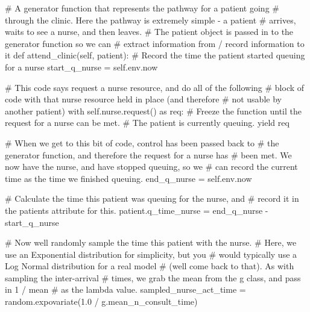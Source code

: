 \documentclass[
  letterpaper,
  DIV=11,
  numbers=noendperiod]{scrreprt}
\newenvironment{Shaded}{\begin{snugshade}}{\end{snugshade}}
\newcommand{\CommentTok}[1]{\textcolor[rgb]{0.37,0.37,0.37}{#1}}
\newcommand{\ControlFlowTok}[1]{\textcolor[rgb]{0.00,0.23,0.31}{#1}}
\newcommand{\FloatTok}[1]{\textcolor[rgb]{0.68,0.00,0.00}{#1}}
\newcommand{\ImportTok}[1]{\textcolor[rgb]{0.00,0.46,0.62}{#1}}
\newcommand{\KeywordTok}[1]{\textcolor[rgb]{0.00,0.23,0.31}{#1}}
\newcommand{\NormalTok}[1]{\textcolor[rgb]{0.00,0.23,0.31}{#1}}
\newcommand{\OperatorTok}[1]{\textcolor[rgb]{0.37,0.37,0.37}{#1}}
\newcommand{\VariableTok}[1]{\textcolor[rgb]{0.07,0.07,0.07}{#1}}
\begin{document}
\begin{tcolorbox}
\begin{Shaded}
\begin{Highlighting}[]
    \CommentTok{\# A generator function that represents the pathway for a patient going}
    \CommentTok{\# through the clinic.  Here the pathway is extremely simple {-} a patient}
    \CommentTok{\# arrives, waits to see a nurse, and then leaves.}
    \CommentTok{\# The patient object is passed in to the generator function so we can}
    \CommentTok{\# extract information from / record information to it}
    \KeywordTok{def}\NormalTok{ attend\_clinic(}\VariableTok{self}\NormalTok{, patient):}
        \CommentTok{\# Record the time the patient started queuing for a nurse}
\NormalTok{        start\_q\_nurse }\OperatorTok{=} \VariableTok{self}\NormalTok{.env.now}

        \CommentTok{\# This code says request a nurse resource, and do all of the following}
        \CommentTok{\# block of code with that nurse resource held in place (and therefore}
        \CommentTok{\# not usable by another patient)}
        \ControlFlowTok{with} \VariableTok{self}\NormalTok{.nurse.request() }\ImportTok{as}\NormalTok{ req:}
            \CommentTok{\# Freeze the function until the request for a nurse can be met.}
            \CommentTok{\# The patient is currently queuing.}
            \ControlFlowTok{yield}\NormalTok{ req}

            \CommentTok{\# When we get to this bit of code, control has been passed back to}
            \CommentTok{\# the generator function, and therefore the request for a nurse has}
            \CommentTok{\# been met.  We now have the nurse, and have stopped queuing, so we}
            \CommentTok{\# can record the current time as the time we finished queuing.}
\NormalTok{            end\_q\_nurse }\OperatorTok{=} \VariableTok{self}\NormalTok{.env.now}

            \CommentTok{\# Calculate the time this patient was queuing for the nurse, and}
            \CommentTok{\# record it in the patient\textquotesingle{}s attribute for this.}
\NormalTok{            patient.q\_time\_nurse }\OperatorTok{=}\NormalTok{ end\_q\_nurse }\OperatorTok{{-}}\NormalTok{ start\_q\_nurse}

            \CommentTok{\# Now we\textquotesingle{}ll randomly sample the time this patient with the nurse.}
            \CommentTok{\# Here, we use an Exponential distribution for simplicity, but you}
            \CommentTok{\# would typically use a Log Normal distribution for a real model}
            \CommentTok{\# (we\textquotesingle{}ll come back to that).  As with sampling the inter{-}arrival}
            \CommentTok{\# times, we grab the mean from the g class, and pass in 1 / mean}
            \CommentTok{\# as the lambda value.}
\NormalTok{            sampled\_nurse\_act\_time }\OperatorTok{=}\NormalTok{ random.expovariate(}\FloatTok{1.0} \OperatorTok{/}
\NormalTok{                                                        g.mean\_n\_consult\_time)}


\end{Highlighting}
\end{Shaded}
\end{tcolorbox}
\end{document}
